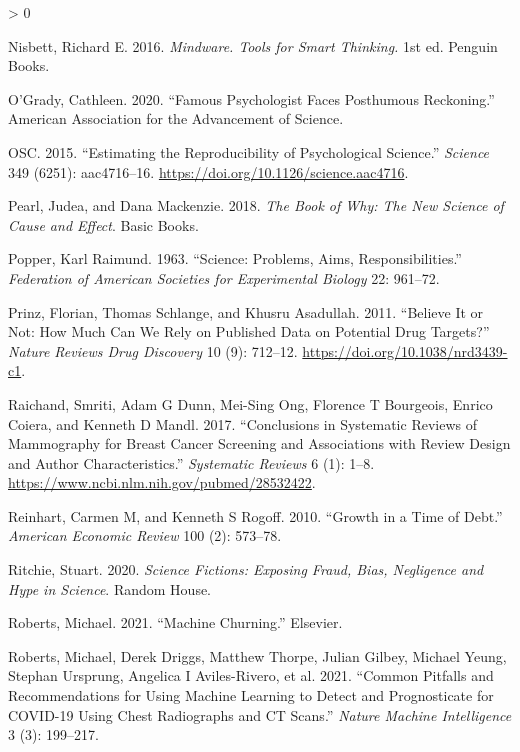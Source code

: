 \documentclass[
  10pt,
  b5paper]{book}
\newlength{\cslhangindent}
\newenvironment{CSLReferences}[2] %
 {%
  \setlength{\parindent}{0pt}
  \ifodd #1 \everypar{\setlength{\hangindent}{\cslhangindent}}\ignorespaces\fi
  \ifnum #2 > 0
  \setlength{\parskip}{#2\baselineskip}
  \fi
 }%
 {}
\begin{document}
\begin{CSLReferences}{1}{0}
\leavevmode\hypertarget{ref-nisbett}{}%
Nisbett, Richard E. 2016. \emph{Mindware. Tools for Smart Thinking.} 1st ed. Penguin Books.

\leavevmode\hypertarget{ref-o2020famous}{}%
O'Grady, Cathleen. 2020. {``Famous Psychologist Faces Posthumous Reckoning.''} American Association for the Advancement of Science.

\leavevmode\hypertarget{ref-r1_osc_EstRep2015}{}%
OSC. 2015. {``Estimating the Reproducibility of Psychological Science.''} \emph{Science} 349 (6251): aac4716--16. \url{https://doi.org/10.1126/science.aac4716}.

\leavevmode\hypertarget{ref-pearl2018book}{}%
Pearl, Judea, and Dana Mackenzie. 2018. \emph{The Book of Why: The New Science of Cause and Effect}. Basic Books.

\leavevmode\hypertarget{ref-popper_1963}{}%
Popper, Karl Raimund. 1963. {``Science: Problems, Aims, Responsibilities.''} \emph{Federation of American Societies for Experimental Biology} 22: 961--72.

\leavevmode\hypertarget{ref-r9_prinz_schlange_asadullah_2011}{}%
Prinz, Florian, Thomas Schlange, and Khusru Asadullah. 2011. {``Believe It or Not: How Much Can We Rely on Published Data on Potential Drug Targets?''} \emph{Nature Reviews Drug Discovery} 10 (9): 712--12. \url{https://doi.org/10.1038/nrd3439-c1}.

\leavevmode\hypertarget{ref-raichand2017conclusions}{}%
Raichand, Smriti, Adam G Dunn, Mei-Sing Ong, Florence T Bourgeois, Enrico Coiera, and Kenneth D Mandl. 2017. {``Conclusions in Systematic Reviews of Mammography for Breast Cancer Screening and Associations with Review Design and Author Characteristics.''} \emph{Systematic Reviews} 6 (1): 1--8. \url{https://www.ncbi.nlm.nih.gov/pubmed/28532422}.

\leavevmode\hypertarget{ref-reinhart2010growth}{}%
Reinhart, Carmen M, and Kenneth S Rogoff. 2010. {``Growth in a Time of Debt.''} \emph{American Economic Review} 100 (2): 573--78.

\leavevmode\hypertarget{ref-ritchie2020science}{}%
Ritchie, Stuart. 2020. \emph{Science Fictions: Exposing Fraud, Bias, Negligence and Hype in Science}. Random House.

\leavevmode\hypertarget{ref-roberts2021machine}{}%
Roberts, Michael. 2021. {``Machine Churning.''} Elsevier.

\leavevmode\hypertarget{ref-roberts2021common}{}%
Roberts, Michael, Derek Driggs, Matthew Thorpe, Julian Gilbey, Michael Yeung, Stephan Ursprung, Angelica I Aviles-Rivero, et al. 2021. {``Common Pitfalls and Recommendations for Using Machine Learning to Detect and Prognosticate for COVID-19 Using Chest Radiographs and CT Scans.''} \emph{Nature Machine Intelligence} 3 (3): 199--217.


\end{CSLReferences}
\end{document}
